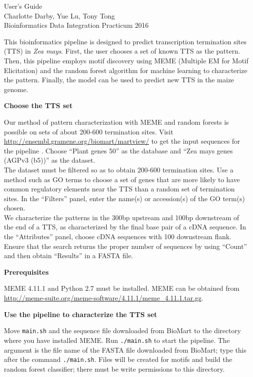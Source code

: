 \documentclass[12pt,letterpaper]{report}
\author{Charlotte Darby}
\begin{document}
\begin{center}
{\huge User's Guide}\\
Charlotte Darby, Yue Lu, Tony Tong\\
Bioinformatics Data Integration Practicum 2016\\
\end{center}

This bioinformatics pipeline is designed to predict transcription termination sites (TTS) in \textsl{Zea mays}. First, the user chooses a set of known TTS as the pattern. Then, this pipeline employs motif discovery using MEME (Multiple EM for Motif Elicitation) \cite{meme} and the random forest algorithm for machine learning \cite{rf} to characterize the pattern. Finally, the model can be used to predict new TTS in the maize genome.


\begin{center}
\textbf{{\large Choose the TTS set}}\\
\end{center}
Our method of pattern characterization with MEME and random forests is possible on sets of about 200-600 termination sites. Visit \url{http://ensembl.gramene.org/biomart/martview/} to get the input sequences for the pipeline \cite{biomart}. Choose ``Plant genes 50'' as the database and ``Zea mays genes (AGPv3 (b5))'' as the dataset.\\
\indent The dataset must be filtered so as to obtain 200-600 termination sites. Use a method such as GO terms to choose a set of genes that are more likely to have common regulatory elements near the TTS than a random set of termination sites. In the ``Filters'' panel, enter the name(s) or accession(s) of the GO term(s) chosen.\\
\indent We characterize the patterns in the 300bp upstream and 100bp downstream of the end of a TTS, as characterized by the final base pair of a cDNA sequence. In the ``Attributes'' panel, choose cDNA sequences with 100 downstream flank. Ensure that the search returns the proper number of sequences by using ``Count'' and then obtain ``Results'' in a FASTA file. 

\begin{center}
\textbf{{\large Prerequisites}}
\end{center}
MEME 4.11.1 and Python 2.7 must be installed. MEME can be obtained from \url{http://meme-suite.org/meme-software/4.11.1/meme_4.11.1.tar.gz}.

\begin{center}
\textbf{{\large Use the pipeline to characterize the TTS set}}
\end{center}
Move \texttt{main.sh} and the sequence file downloaded from BioMart to the directory where you have installed MEME. Run \texttt{./main.sh} to start the pipeline. The argument is the file name of the FASTA file downloaded from BioMart; type this after the command \texttt{./main.sh}. Files will be created for motifs and build the random forest classifier; there must be write permissions to this directory. 
\end{document}
